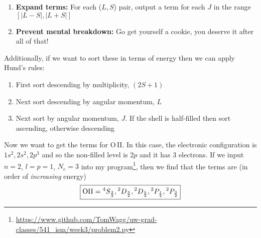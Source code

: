 \documentclass[12pt, letterpaper, twoside]{article}
\begin{document}
{\begin{enumerate}
\begin{enumerate}
            \item Store the pair $(L, S)$ as a possible term
            \item Subtract a boolean matrix - ranging from the $(-L, L)$ rows and from the $(-S, S)$ columns - from the overall matrix
        \end{enumerate}
        \item \textbf{Expand terms:} For each ($L, S$) pair, output a term for each $J$ in the range $[|L - S|, |L + S|]$
        \item \textbf{Prevent mental breakdown:} Go get yourself a cookie, you deserve it after all of that!
    \end{enumerate}
    Additionally, if we want to sort these in terms of energy then we can apply Hund's rules:
    \begin{enumerate}
        \item First sort descending by multiplicity, $(2 S + 1)$
        \item Next sort descending by angular momentum, $L$
        \item Next sort by angular momentum, $J$. If the shell is half-filled then sort ascending, otherwise descending
    \end{enumerate}
    Now we want to get the terms for O\,II. In this case, the electronic configuration is $1 s^2, 2s^2, 2p^3$ and so the non-filled level is $2p$ and it has $3$ electrons. If we input $n = 2$, $l = p = 1$, $N_e = 3$ into my program\footnote{\url{https://www.github.com/TomWagg/uw-grad-classes/541_ism/week3/problem2.py}}, then we find that the terms are (in order of \emph{increasing} energy)
    \begin{equation}
        \boxed{ {\rm O II} = {}^{4} S_{\frac{3}{2}}, {}^{2}D_{\frac{3}{2}}, {}^{2} D_{\frac{5}{2}}, {}^{2} P_{\frac{1}{2}}, {}^{2} P_{\frac{3}{2}} }
    \end{equation} 
}
\end{document}
